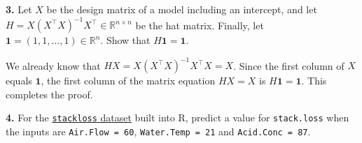 \documentclass[
  a4paper,
]{article}
\theoremstyle{definition}
\theoremstyle{definition}
\theoremstyle{definition}
\theoremstyle{definition}
\theoremstyle{remark}
\begin{document}
\textbf{3.} Let \(X\) be the design matrix of a model including an intercept, and
let \(H = X (X^\top X)^{-1} X^\top \in\mathbb{R}^{n\times n}\) be the hat matrix.
Finally, let \(\mathbf{1} = (1, 1, \ldots, 1) \in\mathbb{R}^n\).
Show that \(H \mathbf{1} = \mathbf{1}\).

\begin{myanswers}
We already know that \(H X = X (X^\top X)^{-1} X^\top X = X\). Since
the first column of \(X\) equals \(\mathbf{1}\), the first column of
the matrix equation \(HX = X\) is \(H\mathbf{1} = \mathbf{1}\). This
completes the proof.

\end{myanswers}

\textbf{4.} For the \href{https://rdrr.io/r/datasets/stackloss.html}{\texttt{stackloss} dataset}
built into R, predict a value for \texttt{stack.loss} when the inputs are
\texttt{Air.Flow\ =\ 60}, \texttt{Water.Temp\ =\ 21} and \texttt{Acid.Conc\ =\ 87}.
\end{document}
